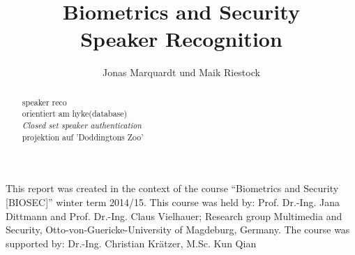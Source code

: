 \documentclass{acmtog}
\begin{document}
\title{Biometrics and Security\\ Speaker Recognition} 

\author{Jonas Marquardt {\upshape und} Maik Riestock
}




\maketitle

\begin{bottomstuff}
This report was created in the context of the course “Biometrics and Security [BIOSEC]” winter term 2014/15.
This course was held by: Prof. Dr.-Ing. Jana Dittmann and Prof. Dr.-Ing. Claus Vielhauer; Research group Multimedia and Security, Otto-von-Guericke-University of Magdeburg, Germany.
The course was supported by: Dr.-Ing. Christian Krätzer, M.Sc. Kun Qian
\end{bottomstuff}


\begin{abstract}
speaker reco\\
orientiert am hyke(database)\\
\textit{Closed set speaker authentication}\\
projektion auf 'Doddingtons Zoo'\\

\end{abstract}




\listoftables

\newpage
\appendix


\end{document}
